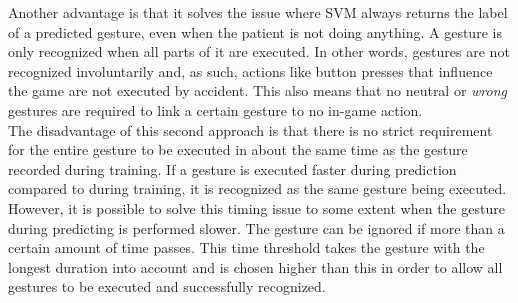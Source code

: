 Another advantage is that it solves the issue where SVM always returns the label of a predicted gesture, even when the patient is not doing anything. A gesture is only recognized when all parts of it are executed. In other words, gestures are not recognized involuntarily and, as such, actions like button presses that influence the game are not executed by accident. This also means that no neutral or \emph{wrong} gestures are required to link a certain gesture to no in-game action.\\

The disadvantage of this second approach is that there is no strict requirement for the entire gesture to be executed in about the same time as the gesture recorded during training. If a gesture is executed faster during prediction compared to during training, it is recognized as the same gesture being executed. However, it is possible to solve this timing issue to some extent when the gesture during predicting is performed slower. The gesture can be ignored if more than a certain amount of time passes. This time threshold takes the gesture with the longest duration into account and is chosen higher than this in order to allow all gestures to be executed and successfully recognized.